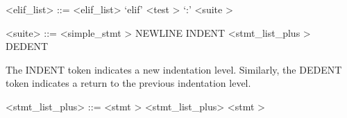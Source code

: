 \label{elifzzzlistb}

\begin{grammar}
<elif_list> ::= \greeke
	\alt <elif_list> `elif' <test \myref[testb]> `:' <suite \myref[suiteb]>
\end{grammar}


\label{suiteb}

\begin{grammar}
<suite> ::= <simple_stmt \myref[simplezzzstmtb]>
	\alt NEWLINE INDENT <stmt_list_plus \myref[stmtzzzlistzzzplusb]> DEDENT
\end{grammar}


The INDENT token indicates a new indentation level.  Similarly, the DEDENT token indicates a return to the previous indentation level.

\label{stmtzzzlistzzzplusb}

\begin{grammar}
<stmt_list_plus> ::= <stmt \myref[stmtb]>
	\alt <stmt_list_plus> <stmt \myref[stmtb]>
\end{grammar}


